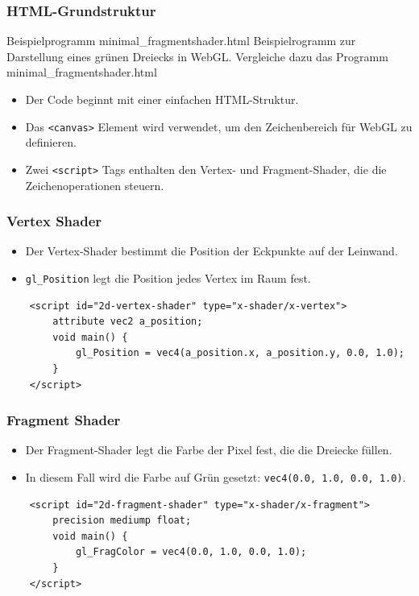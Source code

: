 \documentclass{beamer}
\begin{document}
\begin{frame}
    \frametitle{HTML-Grundstruktur}
    \begin{block}{Beispielprogramm minimal\_fragmentshader.html}
        Beispielrogramm zur Darstellung eines grünen Dreiecks in WebGL.
        Vergleiche dazu das Programm  minimal\_fragmentshader.html
    \end{block}
    
    \begin{itemize}
        \item Der Code beginnt mit einer einfachen HTML-Struktur.
        \item Das \texttt{<canvas>} Element wird verwendet, um den Zeichenbereich für WebGL zu definieren.
        \item Zwei \texttt{<script>} Tags enthalten den Vertex- und Fragment-Shader, die die Zeichenoperationen steuern.
    \end{itemize}
\end{frame}

\begin{frame}[fragile]
    \frametitle{Vertex Shader}
    \begin{itemize}
        \item Der Vertex-Shader bestimmt die Position der Eckpunkte auf der Leinwand.
        \item \texttt{gl\_Position} legt die Position jedes Vertex im Raum fest.
    \end{itemize}
    \begin{verbatim}
    <script id="2d-vertex-shader" type="x-shader/x-vertex">
        attribute vec2 a_position;
        void main() {
            gl_Position = vec4(a_position.x, a_position.y, 0.0, 1.0);
        }
    </script>
    \end{verbatim}
\end{frame}

\begin{frame}[fragile]
    \frametitle{Fragment Shader}
    \begin{itemize}
        \item Der Fragment-Shader legt die Farbe der Pixel fest, die die Dreiecke füllen.
        \item In diesem Fall wird die Farbe auf Grün gesetzt: \texttt{vec4(0.0, 1.0, 0.0, 1.0)}.
    \end{itemize}
    \begin{verbatim}
    <script id="2d-fragment-shader" type="x-shader/x-fragment">
        precision mediump float;
        void main() {
            gl_FragColor = vec4(0.0, 1.0, 0.0, 1.0);
        }
    </script>
    \end{verbatim}
\end{frame}
\end{document}
